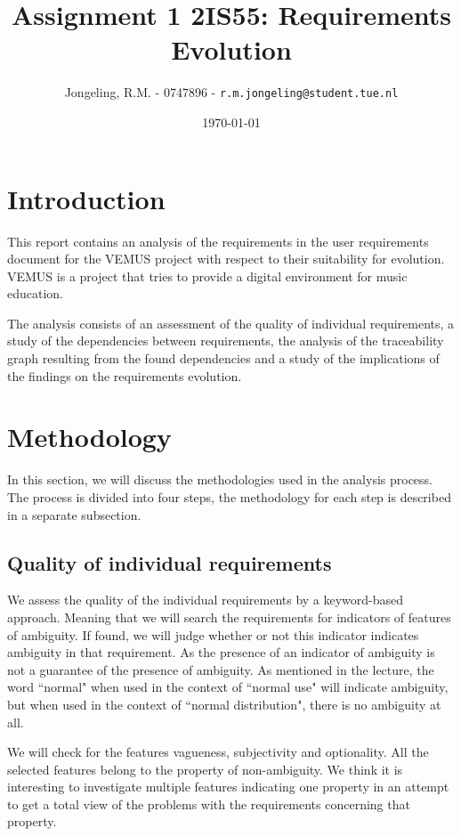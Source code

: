 \documentclass[a4paper,twoside, twocolumn,11pt]{article}
\title{\vspace{-\baselineskip}\sffamily\bfseries Assignment 1 2IS55: Requirements Evolution}
\author{Jongeling, R.M. - 0747896 - {\tt r.m.jongeling@student.tue.nl}}
\date{\today}
\numberwithin{equation}{section}
\begin{document}
\maketitle

\section{Introduction}
This report contains an analysis of the requirements in the user requirements document for the VEMUS project \cite{VEMUS} with respect to their suitability for evolution. VEMUS is a project that tries to provide a digital environment for music education. 

The analysis consists of an assessment of the quality of individual requirements, a study of the dependencies between requirements, the analysis of the traceability graph resulting from the found dependencies and a study of the implications of the findings on the requirements evolution.

\section{Methodology}
In this section, we will discuss the methodologies used in the analysis process. The process is divided into four steps, the methodology for each step is described in a separate subsection.

\subsection{Quality of individual requirements}
We assess the quality of the individual requirements by a keyword-based approach. Meaning that we will search the requirements for indicators of features of ambiguity. If found, we will judge whether or not this indicator indicates ambiguity in that requirement. As the presence of an indicator of ambiguity is not a guarantee of the presence of ambiguity. As mentioned in the lecture, the word ``normal" when used in the context of ``normal use" will indicate ambiguity, but when used in the context of ``normal distribution", there is no ambiguity at all. 

We will check for the features vagueness, subjectivity and optionality. All the selected features belong to the property of non-ambiguity. We think it is interesting to investigate multiple features indicating one property in an attempt to get a total view of the problems with the requirements concerning that property. 
\end{document}
